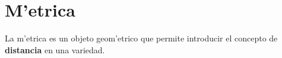 %
%
%

\section{M'etrica}

La m'etrica es un objeto geom'etrico que permite introducir el
concepto de \textbf{distancia} en una variedad.


